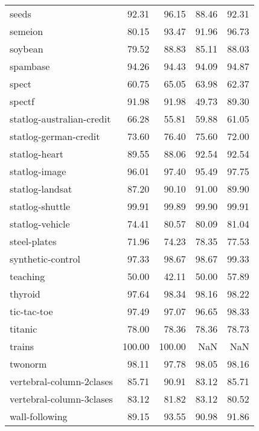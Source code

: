 \begin{longtable}{lrrrr}
                         seeds &   92.31 &    96.15 &  88.46 &  92.31 \\
                       semeion &   80.15 &    93.47 &  91.96 &  96.73 \\
                       soybean &   79.52 &    88.83 &  85.11 &  88.03 \\
                      spambase &   94.26 &    94.43 &  94.09 &  94.87 \\
                         spect &   60.75 &    65.05 &  63.98 &  62.37 \\
                        spectf &   91.98 &    91.98 &  49.73 &  89.30 \\
     statlog-australian-credit &   66.28 &    55.81 &  59.88 &  61.05 \\
         statlog-german-credit &   73.60 &    76.40 &  75.60 &  72.00 \\
                 statlog-heart &   89.55 &    88.06 &  92.54 &  92.54 \\
                 statlog-image &   96.01 &    97.40 &  95.49 &  97.75 \\
               statlog-landsat &   87.20 &    90.10 &  91.00 &  89.90 \\
               statlog-shuttle &   99.91 &    99.89 &  99.90 &  99.91 \\
               statlog-vehicle &   74.41 &    80.57 &  80.09 &  81.04 \\
                  steel-plates &   71.96 &    74.23 &  78.35 &  77.53 \\
             synthetic-control &   97.33 &    98.67 &  98.67 &  99.33 \\
                      teaching &   50.00 &    42.11 &  50.00 &  57.89 \\
                       thyroid &   97.64 &    98.34 &  98.16 &  98.22 \\
                   tic-tac-toe &   97.49 &    97.07 &  96.65 &  98.33 \\
                       titanic &   78.00 &    78.36 &  78.36 &  78.73 \\
                        trains &  100.00 &   100.00 &    NaN &    NaN \\
                       twonorm &   98.11 &    97.78 &  98.05 &  98.16 \\
      vertebral-column-2clases &   85.71 &    90.91 &  83.12 &  85.71 \\
      vertebral-column-3clases &   83.12 &    81.82 &  83.12 &  80.52 \\
                wall-following &   89.15 &    93.55 &  90.98 &  91.86 \\

\end{longtable}
